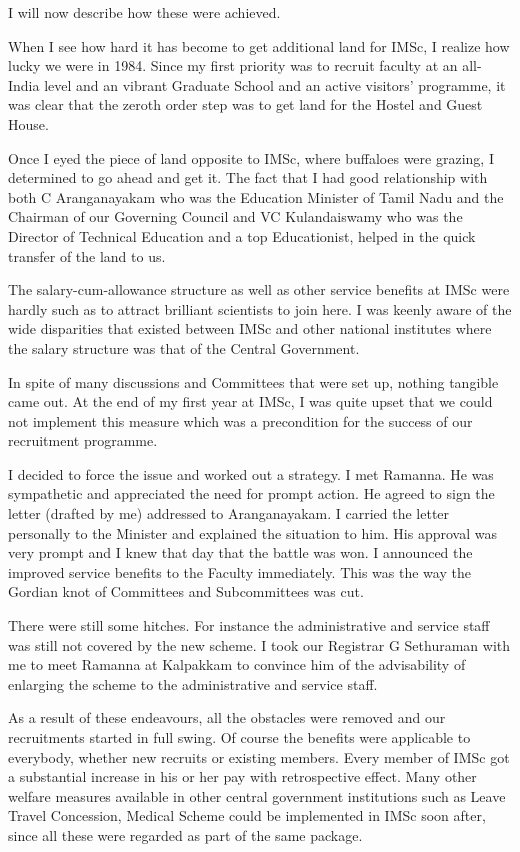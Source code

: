 I will now describe how these were achieved. 

When I see how hard it has become to get additional land for IMSc, I 
realize how lucky we were in 1984. Since my first priority was to 
recruit faculty at an all-India level and an vibrant Graduate School and 
an active visitors' programme, it was clear that the zeroth order step 
was to get land for the Hostel and Guest House.

Once I eyed the piece of land opposite to IMSc, where buffaloes were 
grazing, I determined to go ahead and get it. The fact that I had good 
relationship with both C Aranganayakam who was the Education Minister of 
Tamil Nadu and the Chairman of our Governing Council and VC 
Kulandaiswamy who was the Director of Technical Education and a top 
Educationist, helped in the quick transfer of the land to us.

The salary-cum-allowance structure as well as other service benefits at 
IMSc were hardly such as to attract brilliant scientists to join here. I 
was keenly aware of the wide disparities that existed between IMSc and 
other national institutes where the salary structure was that of the 
Central Government.

In spite of many discussions and Committees that were set up, nothing 
tangible came out. At the end of my first year at IMSc, I was quite 
upset that we could not implement this measure which was a precondition 
for the success of our recruitment programme.

I decided to force the issue and worked out a strategy. I met Ramanna. 
He was sympathetic and appreciated the need for prompt action. He agreed 
to sign the letter (drafted by me) addressed to Aranganayakam. I carried 
the letter personally to the Minister and explained the situation to 
him. His approval was very prompt and I knew that day that the battle 
was won. I announced the improved service benefits to the Faculty 
immediately. This was the way the Gordian knot of Committees and 
Subcommittees was cut.

There were still some hitches. For instance the administrative and 
service staff was still not covered by the new scheme. I took our 
Registrar G Sethuraman with me to meet Ramanna at Kalpakkam to convince 
him of the advisability of enlarging the scheme to the administrative 
and service staff.

As a result of these endeavours, all the obstacles were removed and our 
recruitments started in full swing. Of course the benefits were 
applicable to everybody, whether new recruits or existing members. Every 
member of IMSc got a substantial increase in his or her pay with 
retrospective effect. Many other welfare measures available in other 
central government institutions such as Leave Travel Concession, Medical 
Scheme could be implemented in IMSc soon after, since all these were 
regarded as part of the same package.

